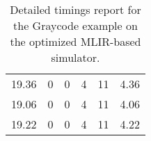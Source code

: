 \begin{table}[h]
{\begin{tabular}{cccccc}
            19.36              & 0                          & 0                          & 4                          & 11                         & 4.36                   \\
            19.06              & 0                          & 0                          & 4                          & 11                         & 4.06                   \\
            19.22              & 0                          & 0                          & 4                          & 11                         & 4.22                   \\
            \bottomrule
        \end{tabular}
    }
    \caption{Detailed timings report for the Graycode example on the optimized MLIR-based simulator.}
\end{table}

